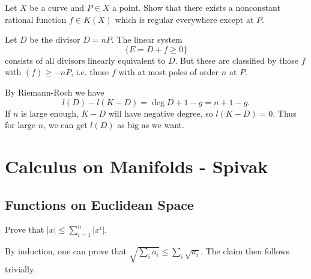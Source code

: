\documentclass[11pt, english]{article}
\begin{document}
\begin{exc}[Exercise 1.1]
Let $X$ be a curve and $P \in X$ a point. Show that there exists a nonconstant rational function $f \in K(X)$ which is regular everywhere except at $P$.
\end{exc}
\begin{sol}
Let $D$ be the divisor $D=nP$. The linear system 
$$
\{ E = D + f \geq 0 \}
$$
consists of all divisors linearly equivalent to $D$. But these are classified by those $f$ with $(f) \geq -nP$, i.e. those $f$ with at most poles of order $n$ at $P$.

By Riemann-Roch we have
$$
l(D)-l(K-D) = \deg D +1 -g = n+1-g.
$$
If $n$ is large enough, $K-D$ will have negative degree, so $l(K-D)=0$. Thus for large $n$, we can get $l(D)$ as big as we want.

\end{sol}

\section{Calculus on Manifolds - Spivak}

\subsection{Functions on Euclidean Space}

\begin{exc}[Exercise 1.1]
Prove that $\lvert x \rvert \leq \sum_{i=1}^n \lvert x^i  \rvert$.  
\end{exc}
\begin{sol}
 By induction, one can prove that $\sqrt{\sum_i a_i} \leq \sum_i \sqrt{a_i}$. The claim then follows trivially.
\end{sol}
\end{document}
